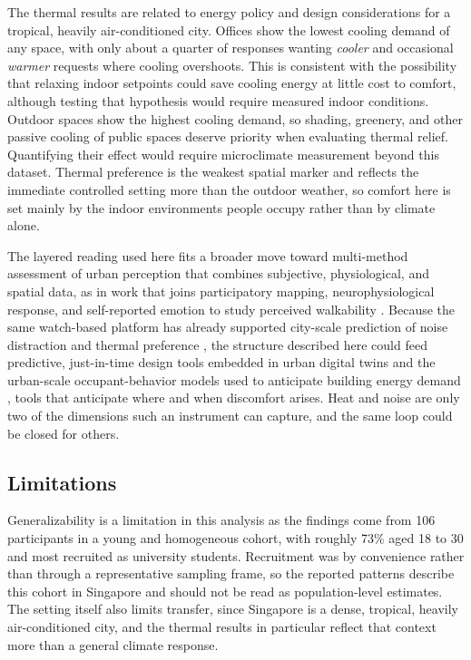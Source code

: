 \documentclass[]{interact}
\begin{document}
The thermal results are related to energy policy and design considerations for a tropical, heavily air-conditioned city.
Offices show the lowest cooling demand of any space, with only about a quarter of responses wanting \emph{cooler} and occasional \emph{warmer} requests where cooling overshoots.
This is consistent with the possibility that relaxing indoor setpoints could save cooling energy at little cost to comfort, although testing that hypothesis would require measured indoor conditions.
Outdoor spaces show the highest cooling demand, so shading, greenery, and other passive cooling of public spaces deserve priority when evaluating thermal relief.
Quantifying their effect would require microclimate measurement beyond this dataset.
Thermal preference is the weakest spatial marker and reflects the immediate controlled setting more than the outdoor weather, so comfort here is set mainly by the indoor environments people occupy rather than by climate alone.

The layered reading used here fits a broader move toward multi-method assessment of urban perception that combines subjective, physiological, and spatial data, as in work that joins participatory mapping, neurophysiological response, and self-reported emotion to study perceived walkability \citep{Yildirim2026-rg}.
Because the same watch-based platform has already supported city-scale prediction of noise distraction and thermal preference \citep{Miller2025-qu}, the structure described here could feed predictive, just-in-time design tools embedded in urban digital twins \citep{Lei2026-dn} and the urban-scale occupant-behavior models used to anticipate building energy demand \citep{Salim2020-ec}, tools that anticipate where and when discomfort arises.
Heat and noise are only two of the dimensions such an instrument can capture, and the same loop could be closed for others.

\subsection{Limitations}\label{sec:disc-limitations}
Generalizability is a limitation in this analysis as the findings come from 106 participants in a young and homogeneous cohort, with roughly 73\% aged 18 to 30 and most recruited as university students.
Recruitment was by convenience rather than through a representative sampling frame, so the reported patterns describe this cohort in Singapore and should not be read as population-level estimates.
The setting itself also limits transfer, since Singapore is a dense, tropical, heavily air-conditioned city, and the thermal results in particular reflect that context more than a general climate response.
\end{document}
